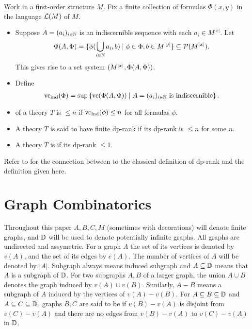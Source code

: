 \documentclass{amsart}
\begin{document}
\begin{Definition} \label{def_dp}
  Work in a first-order structure $M$.
  Fix a finite collection of formulas $\Phi(x, y)$ in the language $\mathcal L(M)$ of $M$.
  \begin{itemize}
  \item Suppose $A = (a_i)_{i \in \mathbb{N}}$ is an indiscernible sequence with each $a_i \in M^{|x|}$.
    Let
    \begin{align*}
      \Phi(A, \Phi) = \{\phi(\bigcup_{i \in \mathbb{N}} a_i, b) \mid \phi \in \Phi, b \in M^{|y|}\} \subseteq \mathcal P(M^{|x|}).     
    \end{align*}
    This gives rise to a set system $(M^{|x|}, \Phi(A, \Phi))$.
  \item Define
    \begin{align*}
      \operatorname{vc}_{\operatorname{ind}}(\Phi) = \sup \left\{\operatorname{vc}(\Phi(A, \Phi)) \mid A = (a_i)_{i \in \mathbb{N}} \text{ is indiscernible}\right\}.
    \end{align*}
  \item {} of a theory $T$ is $\leq n$ if $\operatorname{vc}_{\operatorname{ind}}(\phi) \leq n$ for all formulas $\phi$.
  \item A theory $T$ is said to have finite dp-rank if its dp-rank is $\leq n$ for some $n$.
  \item A theory $T$ is  if its dp-rank $\leq 1$.
  \end{itemize}
\end{Definition}

Refer to \cite{guingona} for the connection between to the classical definition of dp-rank and the definition given here.

\section{Graph Combinatorics}
Throughout this paper $A, B, C, M$ (sometimes with decorations) will denote finite graphs,
and $\mathbb D$ will be used to denote potentially infinite graphs.
All graphs are undirected and assymetric.
For a graph $A$ the set of its vertices is denoted by $v(A)$, and the set of its edges by $e(A)$.
The number of vertices of $A$ will be denoted by $|A|$.
Subgraph always means induced subgraph and $A \subseteq \mathbb D$ means that $A$ is a subgraph of $\mathbb D$.
For two subgraphs $A, B$ of a larger graph, the union $A \cup B$ denotes the graph induced by $v(A) \cup v(B)$.
Similarly, $A - B$ means a subgraph of $A$ induced by the vertices of $v(A) - v(B)$.
For $A \subseteq B \subseteq \mathbb D$ and $A \subseteq C \subseteq \mathbb D$,
graphs $B,C$ are said to be  if $v(B) - v(A)$ is disjoint from $v(C) - v(A)$
and there are no edges from $v(B) - v(A)$ to $v(C) - v(A)$ in $\mathbb D$.
\end{document}

